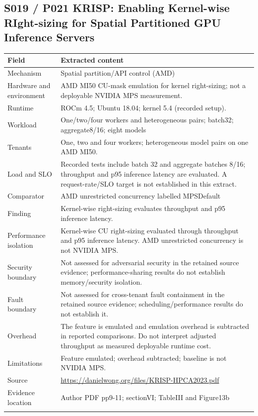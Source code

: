 \clearpage\subsection{S019 / P021 KRISP: Enabling Kernel-wise RIght-sizing for Spatial Partitioned GPU Inference Servers}

\cite{P021}

\begin{longtable}{>{\raggedright\arraybackslash}p{}>{\raggedright\arraybackslash}p{}}
\toprule
\textbf{Field} & \textbf{Extracted content}\\\midrule\endhead
Mechanism & Spatial partition/API control (AMD)\\\addlinespace
Hardware and environment & AMD MI50 CU-mask emulation for kernel right-sizing; not a deployable NVIDIA MPS measurement.\\\addlinespace
Runtime & ROCm 4.5; Ubuntu 18.04; kernel 5.4 (recorded setup).\\\addlinespace
Workload & One/two/four workers and heterogeneous pairs; batch32; aggregate8/16; eight models\\\addlinespace
Tenants & One, two and four workers; heterogeneous model pairs on one AMD MI50.\\\addlinespace
Load and SLO & Recorded tests include batch 32 and aggregate batches 8/16; throughput and p95 inference latency are evaluated. A request-rate/SLO target is not established in this extract.\\\addlinespace
Comparator & AMD unrestricted concurrency labelled MPSDefault\\\addlinespace
Finding & Kernel-wise right-sizing evaluates throughput and p95 inference latency.\\\addlinespace
Performance isolation & Kernel-wise CU right-sizing evaluated through throughput and p95 inference latency. AMD unrestricted concurrency is not NVIDIA MPS.\\\addlinespace
Security boundary & Not assessed for adversarial security in the retained source evidence; performance-sharing results do not establish memory/security isolation.\\\addlinespace
Fault boundary & Not assessed for cross-tenant fault containment in the retained source evidence; scheduling/performance results do not establish it.\\\addlinespace
Overhead & The feature is emulated and emulation overhead is subtracted in reported comparisons. Do not interpret adjusted throughput as measured deployable runtime cost.\\\addlinespace
Limitations & Feature emulated; overhead subtracted; baseline is not NVIDIA MPS.\\\addlinespace
Source & \url{https://danielwong.org/files/KRISP-HPCA2023.pdf}\\\addlinespace
Evidence location & Author PDF pp9-11; sectionVI; TableIII and Figure13b\\\addlinespace
\bottomrule\end{longtable}

